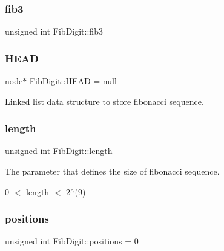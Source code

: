 \mbox{\label{classFibDigit_a98a33382e322c6455eecdcfb78170417}} 
\subsubsection{\texorpdfstring{fib3}{fib3}}
{\footnotesize\ttfamily unsigned int Fib\+Digit\+::fib3\hspace{0.3cm}{\ttfamily [private]}}

\mbox{\label{classFibDigit_af25e4de406bf87e1a7a3323aaf2355f9}} 
\subsubsection{\texorpdfstring{H\+E\+AD}{HEAD}}
{\footnotesize\ttfamily \mbox{\hyperlink{structnode}{node}}$\ast$ Fib\+Digit\+::\+H\+E\+AD = \mbox{\hyperlink{FibDigit_8hpp_ac97b8ee753e4405397a42ad5799b0f9e}{null}}\hspace{0.3cm}{\ttfamily [private]}}



Linked list data structure to store fibonacci sequence. 

\mbox{\label{classFibDigit_a70d34085c62bdfb57390cc0ed04f9574}} 
\subsubsection{\texorpdfstring{length}{length}}
{\footnotesize\ttfamily unsigned int Fib\+Digit\+::length\hspace{0.3cm}{\ttfamily [private]}}



The parameter that defines the size of fibonacci sequence. 

0 $<$ length $<$ 2$^\wedge$(9) \mbox{\label{classFibDigit_a980e50a82197fa46e104ac2f9208a70b}} 
\subsubsection{\texorpdfstring{positions}{positions}}
{\footnotesize\ttfamily unsigned int Fib\+Digit\+::positions = 0\hspace{0.3cm}{\ttfamily [private]}}



